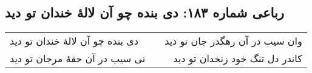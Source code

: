 \begin{center}
\section*{رباعی شماره ۱۸۳: دی بنده چو آن لالهٔ خندان تو دید}
\label{sec:sh183}
\begin{longtable}{l p{0.5cm} r}
دی بنده چو آن لالهٔ خندان تو دید
&&
وان سیب در آن رهگذر جان تو دید
\\
نی سیب در آن حقهٔ مرجان تو دید
&&
کاندر دل تنگ خود زنخدان تو دید
\\
\end{longtable}
\end{center}
